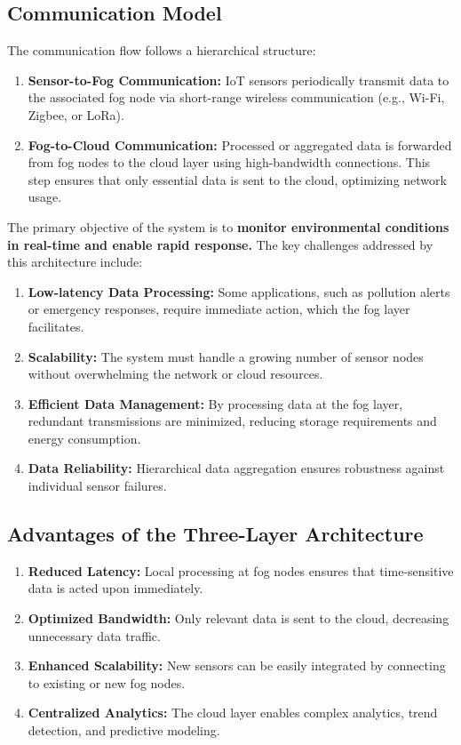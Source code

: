 \documentclass[conference]{IEEEtran}
\begin{document}
	\subsection{Communication Model}
	The communication flow follows a hierarchical structure:
	\begin{enumerate}
		\item \textbf{Sensor-to-Fog Communication:} IoT sensors periodically transmit data to the associated fog node via short-range wireless communication (e.g., Wi-Fi, Zigbee, or LoRa).
		\item  \textbf{Fog-to-Cloud Communication:} Processed or aggregated data is forwarded from fog nodes to the cloud layer using high-bandwidth connections. This step ensures that only essential data is sent to the cloud, optimizing network usage.
	\end{enumerate}
	The primary objective of the system is to \textbf{monitor environmental conditions in real-time and enable rapid response.} The key challenges addressed by this architecture include:
	\begin{enumerate}
		\item \textbf{Low-latency Data Processing:} Some applications, such as pollution alerts or emergency responses, require immediate action, which the fog layer facilitates.
		\item \textbf{Scalability:} The system must handle a growing number of sensor nodes without overwhelming the network or cloud resources.
		\item \textbf{Efficient Data Management:} By processing data at the fog layer, redundant transmissions are minimized, reducing storage requirements and energy consumption.
		\item \textbf{Data Reliability:} Hierarchical data aggregation ensures robustness against individual sensor failures.
	\end{enumerate}
	\subsection{Advantages of the Three-Layer Architecture}
	\begin{enumerate}
		\item \textbf{Reduced Latency:} Local processing at fog nodes ensures that time-sensitive data is acted upon immediately.
		\item \textbf{Optimized Bandwidth:} Only relevant data is sent to the cloud, decreasing unnecessary data traffic.
		\item \textbf{Enhanced Scalability:} New sensors can be easily integrated by connecting to existing or new fog nodes.
		\item \textbf{Centralized Analytics:} The cloud layer enables complex analytics, trend detection, and predictive modeling.
	\end{enumerate}
	
		
\end{document}
